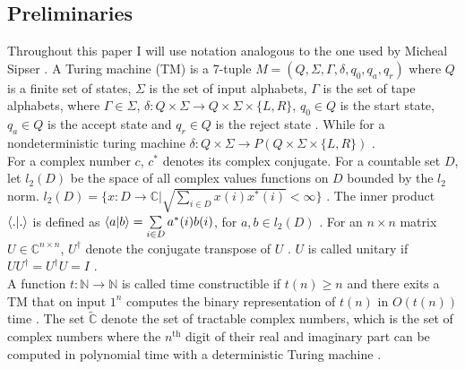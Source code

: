 \documentclass[11pt,a4paper]{article}
\begin{document}
\subsection*{Preliminaries}
    Throughout this paper I will use notation analogous to the one used by Micheal Sipser \cite{10}. A Turing machine (TM) is a 7-tuple $M = (Q, \Sigma, \Gamma, \delta, q_0, q_a, q_r)$ where $Q$ is a finite set of states, 
    $\Sigma$ is the set of input alphabets, $\Gamma$ is the set of tape alphabets, where $\Gamma \in \Sigma$, $\delta: Q \times \Sigma \to Q \times \Sigma \times \{L,R\}$, $q_0\in Q$ is the start state, $q_a\in Q$ is the accept state and $q_r\in Q$ is the reject state \cite{10}.
    While for a nondeterministic turing machine $\delta: Q \times \Sigma \to P(Q \times \Sigma \times \{L,R\})$ \cite{10}. 
    \\For a complex number $c$, $c^*$ denotes its complex conjugate. For a countable set $D$, let $l_2(D)$ be the space of all complex values functions on $D$ bounded by the $l_2$ norm.
    $l_2(D)= \{x:D\to \mathbb{C}|\sqrt{\sum\limits_{i\in D}x(i)x^*(i) }<\infty \}$ \cite{4}\cite{17}. The inner product $\braket{.|.}$ is defined as $\braket{a|b} = \sum\limits_{i\in D}a^*(i)b(i)$, for $a,b \in l_2(D)$ \cite{17}.
    For an $n\times n$ matrix $U \in \mathbb{C}^{n\times n}$, $U^\dag$ denote the conjugate transpose of $U$ \cite{8}. $U$ is called unitary if $UU^\dag = U^\dag U = I$ \cite{8}.
    \\A function $t:\mathbb{N} \to \mathbb{N}$ is called time constructible if $t(n) \geq n$ and there exits a TM that on input $1^n$ computes the binary representation of $t(n)$ in $O(t(n))$ time \cite{6}\cite{10}.
    The set $\widetilde{\mathbb{C}}$ denote the set of tractable complex numbers, which is the set of complex numbers where the $n^{\text{th}}$ digit of their real and imaginary part can be computed in polynomial time with a deterministic Turing machine \cite{8}.
\end{document}
